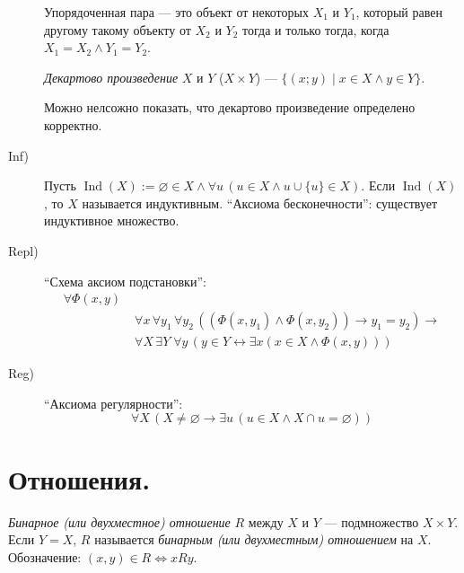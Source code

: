 \documentclass[12pt,a4paper]{article}
\DeclareMathOperator{\Ind}{Ind}
\begin{document}
\begin{definition}[аксиомы ZFC (= ZF (аксиомы Цермело-Френкеля) + C (аксиома выбора))]
\begin{description}
                \begin{definition}
                    Упорядоченная пара --- это объект от некоторых $X_1$ и $Y_1$, который равен другому такому объекту от $X_2$ и $Y_2$ тогда и только тогда, когда $X_1 = X_2 \wedge Y_1 = Y_2$.
                \end{definition}

                \begin{definition}
                    \emph{Декартово произведение} $X$ и $Y$ ($X \times Y$) --- $\{(x; y) \mid x \in X \wedge y \in Y\}$. 
                \end{definition}

                \begin{remark}
                    Можно нелсожно показать, что декартово произведение определено корректно.
                \end{remark}
            \item[Inf)] Пусть $\Ind(X) := \varnothing \in X \wedge \forall u\, (u \in X \wedge u \cup \{u\} \in X)$. Если $\Ind(X)$, то $X$ называется индуктивным. ``Аксиома бесконечности'': существует индуктивное множество.
            \item[Repl)] ``Схема аксиом подстановки'':
                \begin{align*}
                    \forall \Phi(x, y)\;&\\
                    &\forall x\, \forall y_1\, \forall y_2\, ((\Phi(x, y_1) \wedge \Phi(x, y_2)) \rightarrow y_1 = y_2) \rightarrow\\
                    &\forall X\, \exists Y\; \forall y\, (y \in Y \leftrightarrow \exists x (x \in X \wedge \Phi(x, y)))
                \end{align*}
            \item[Reg)] ``Аксиома регулярности'':
                \[
                    \forall X\, (X\neq \varnothing \rightarrow \exists u\, (u\in X \wedge X \cap u = \varnothing))
                \]
        \end{description}
    \end{definition}

    \section{Отношения.}

    \begin{definition}
        \emph{Бинарное (или двухместное) отношение} $R$ между $X$ и $Y$ --- подмножество $X \times Y$. Если $Y = X$, $R$ называется \emph{бинарным (или двухместным) отношением} на $X$.\\
        Обозначение: $(x, y) \in R \Leftrightarrow xRy$.
    \end{definition}
\end{document}
